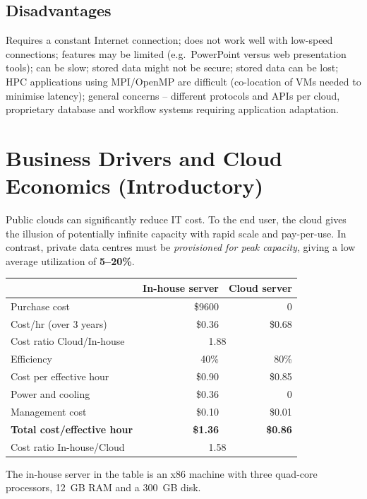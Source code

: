 \documentclass[11pt,a4paper,openany]{report}
\begin{document}
\subsection{Disadvantages}
Requires a constant Internet connection; does not work well with low-speed connections; features may be
limited (e.g.\ PowerPoint versus web presentation tools); can be slow; stored data might not be secure;
stored data can be lost; HPC applications using MPI/OpenMP are difficult (co-location of VMs needed to
minimise latency); general concerns -- different protocols and APIs per cloud, proprietary database and
workflow systems requiring application adaptation.

\section{Business Drivers and Cloud Economics (Introductory)}
Public clouds can significantly reduce IT cost. To the end user, the cloud gives the illusion of
potentially infinite capacity with rapid scale and pay-per-use. In contrast, private data centres must be
\emph{provisioned for peak capacity}, giving a low average utilization of \textbf{5--20\%}.

\begin{center}
\begin{tabular}{lrr}
\toprule
 & In-house server & Cloud server\\
\midrule
Purchase cost & \$9600 & 0\\
Cost/hr (over 3 years) & \$0.36 & \$0.68\\
Cost ratio Cloud/In-house & \multicolumn{2}{c}{1.88}\\
Efficiency & 40\% & 80\%\\
Cost per effective hour & \$0.90 & \$0.85\\
Power and cooling & \$0.36 & 0\\
Management cost & \$0.10 & \$0.01\\
\textbf{Total cost/effective hour} & \textbf{\$1.36} & \textbf{\$0.86}\\
Cost ratio In-house/Cloud & \multicolumn{2}{c}{1.58}\\
\bottomrule
\end{tabular}
\end{center}
The in-house server in the table is an x86 machine with three quad-core processors, 12~GB RAM and a 300~GB disk.
\end{document}
